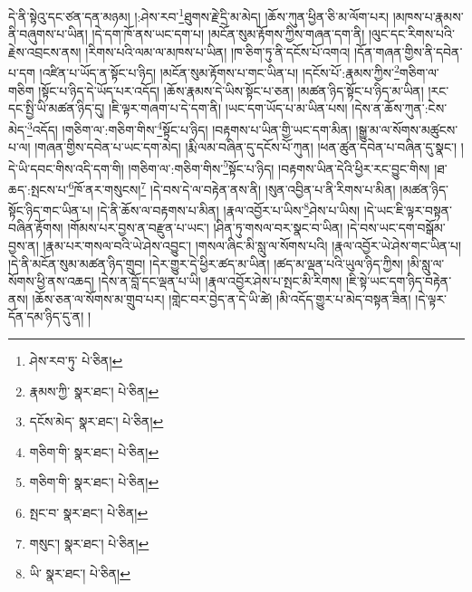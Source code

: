 དེ་ནི་སྟེའུ་དང་ཙན་དན་མཉམ། །:ཤེས་རབ་\footnote{ཤེས་རབ་ཏུ་  པེ་ཅིན། }ཐུགས་རྗེ་དྲི་མ་མེད། །ཆོས་ཀུན་ཕྱིན་ཅི་མ་ལོག་པར། །མཁས་པ་རྣམས་ནི་བཞུགས་པ་ཡིན། །དེ་དག་ཁོ་ནས་ཡང་དག་པ། །མངོན་སུམ་རྟོགས་ཀྱིས་གཞན་དག་ནི། །ལུང་དང་རིགས་པའི་རྗེས་འབྲངས་ནས། །རིགས་པའི་ལམ་ལ་མཁས་པ་ཡིན། །ཁ་ཅིག་ཏུ་ནི་དངོས་པོ་འགའ། །དོན་གཞན་གྱིས་ནི་དབེན་པ་དག །འཛིན་པ་ཡོད་ན་སྟོང་པ་ཉིད། །མངོན་སུམ་རྟོགས་པ་གང་ཡིན་པ། །དངོས་པོ་:རྣམས་ཀྱིས་\footnote{རྣམས་ཀྱི་  སྣར་ཐང་།  པེ་ཅིན། }གཅིག་ལ་གཅིག །སྟོང་པ་ཉིད་དེ་ཡོད་པར་འདོད། །ཆོས་རྣམས་དེ་ཡིས་སྟོང་པ་ཅན། །མཚན་ཉིད་སྟོང་པ་ཉིད་མ་ཡིན། །རང་དང་སྤྱི་ཡི་མཚན་ཉིད་དུ། །ཇི་ལྟར་གཞག་པ་དེ་དག་ནི། །ཡང་དག་ཡོད་པ་མ་ཡིན་པས། །དེས་ན་ཆོས་ཀུན་:ངེས་མེད་\footnote{དངོས་མེད་  སྣར་ཐང་།  པེ་ཅིན། }འདོད། །གཅིག་ལ་:གཅིག་གིས་\footnote{གཅིག་གི་  སྣར་ཐང་།  པེ་ཅིན། }སྟོང་པ་ཉིད། །བརྟགས་པ་ཡིན་གྱི་ཡང་དག་མིན། །སྒྱུ་མ་ལ་སོགས་མཚུངས་པ་ལ། །གཞན་གྱིས་དབེན་པ་ཡང་དག་མེད། །རྨི་ལམ་བཞིན་དུ་དངོས་པོ་ཀུན། །ཕན་ཚུན་དབེན་པ་བཞིན་དུ་སྣང་། །དེ་ཡི་དབང་གིས་འདི་དག་གི། །གཅིག་ལ་:གཅིག་གིས་\footnote{གཅིག་གི་  སྣར་ཐང་།  པེ་ཅིན། }སྟོང་པ་ཉིད། །བརྟགས་ཡིན་དེའི་ཕྱིར་རང་བྱུང་གིས། །ཐ་ཆད་:སྤངས་པ་\footnote{སྤང་བ་  སྣར་ཐང་།  པེ་ཅིན། }ཁོ་ནར་གསུངས།\footnote{གསུང་།  སྣར་ཐང་།  པེ་ཅིན། } །དེ་བས་དེ་ལ་བརྟེན་ནས་ནི། །སུན་འབྱིན་པ་ནི་རིགས་པ་མིན། །མཚན་ཉིད་སྟོང་ཉིད་གང་ཡིན་པ། །དེ་ནི་ཆོས་ལ་བརྟགས་པ་མིན། །རྣལ་འབྱོར་པ་ཡིས་\footnote{ཡི་  སྣར་ཐང་།  པེ་ཅིན། }ཤེས་པ་ཡིས། །དེ་ཡང་ཇི་ལྟར་བསྟན་བཞིན་རྟོགས། །གོམས་པར་བྱས་ན་བརྫུན་པ་ཡང་། །ཤིན་ཏུ་གསལ་བར་སྣང་བ་ཡིན། །དེ་བས་ཡང་དག་བསྒོམ་བྱས་ན། །རྣམ་པར་གསལ་བའི་ཡེ་ཤེས་འབྱུང་། །གསལ་ཞིང་མི་སླུ་ལ་སོགས་པའི། །རྣལ་འབྱོར་ཡེ་ཤེས་གང་ཡིན་པ། །དེ་ནི་མངོན་སུམ་མཚན་ཉིད་གྲུབ། །དེར་གྱུར་དེ་ཕྱིར་ཚད་མ་ཡིན། །ཚད་མ་ལྡན་པའི་ཡུལ་ཉིད་ཀྱིས། །མི་སླུ་ལ་སོགས་ཕྱི་ནས་འཆད། །དེས་ན་བློ་དང་ལྡན་པ་ཡི། །རྣལ་འབྱོར་ཤེས་པ་སྤང་མི་རིགས། །ཇི་སྟེ་ཡང་དག་ཉིད་བརྟེན་ནས། །ཆོས་ཅན་ལ་སོགས་མ་གྲུབ་པར། །གླེང་བར་བྱེད་ན་དེ་ཡི་ཚེ། །མི་འདོད་གྱུར་པ་མེད་བསྟན་ཟིན། །དེ་ལྟར་དོན་དམ་ཉིད་དུ་ན། །
